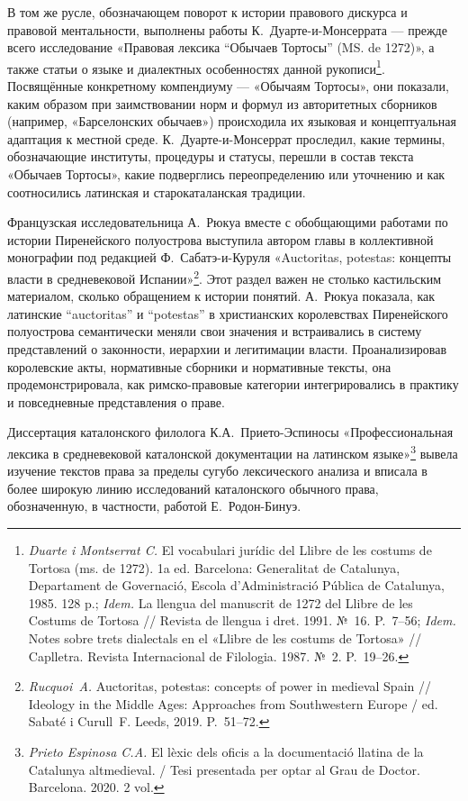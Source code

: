 В том же русле, обозначающем поворот к истории правового дискурса и правовой ментальности, выполнены работы К.~Дуарте-и-Монсеррата --- прежде всего исследование «Правовая лексика “Обычаев Тортосы” (MS. de 1272)», а также статьи о языке и диалектных особенностях данной рукописи\footnote{\emph{Duarte i Montserrat C.} El vocabulari jurídic del Llibre de les costums de Tortosa (ms. de 1272). 1a ed. Barcelona: Generalitat de Catalunya, Departament de Governació, Escola d’Administració Pública de Catalunya, 1985. 128 p.; \emph{Idem.} La llengua del manuscrit de 1272 del Llibre de les Costums de Tortosa // Revista de llengua i dret. 1991. №~16. P.~7--56; \emph{Idem.} Notes sobre trets dialectals en el «Llibre de les costums de Tortosa» // Caplletra. Revista Internacional de Filologia. 1987. №~2. P.~19--26.}. Посвящённые конкретному компендиуму --- «Обычаям Тортосы», они показали, каким образом при заимствовании норм и формул из авторитетных сборников (например, «Барселонских обычаев») происходила их языковая и концептуальная адаптация к местной среде. К.~Дуарте-и-Монсеррат проследил, какие термины, обозначающие институты, процедуры и статусы, перешли в состав текста «Обычаев Тортосы», какие подверглись переопределению или уточнению и как соотносились латинская и старокаталанская традиции.

Французская исследовательница А.~Рюкуа вместе с обобщающими работами по истории Пиренейского полуострова выступила автором главы в коллективной монографии под редакцией Ф.~Сабатэ-и-Куруля «Auctoritas, potestas: концепты власти в средневековой Испании»\footnote{\emph{Rucquoi~A. }Auctoritas, potestas: concepts of power in medieval Spain // Ideology in the Middle Ages: Approaches from Southwestern Europe / ed. Sabaté i Curull~F. Leeds, 2019. P.~51--72.}. Этот раздел важен не столько кастильским материалом, сколько обращением к истории понятий. А.~Рюкуа показала, как латинские “auctoritas” и “potestas” в христианских королевствах Пиренейского полуострова семантически меняли свои значения и встраивались в систему представлений о законности, иерархии и легитимации власти. Проанализировав королевские акты, нормативные сборники и нормативные тексты, она продемонстрировала, как римско-правовые категории интегрировались в практику и повседневные представления о праве.

Диссертация каталонского филолога К.А.~Прието-Эспиносы «Профессиональная лексика в средневековой каталонской документации на латинском языке»\footnote{\emph{Prieto Espinosa C.A.} El lèxic dels oficis a la documentació llatina de la Catalunya altmedieval. / Tesi presentada per optar al Grau de Doctor. Barcelona. 2020. 2 vol.} вывела изучение текстов права за пределы сугубо лексического анализа и вписала в более широкую линию исследований каталонского обычного права, обозначенную, в частности, работой Е.~Родон-Бинуэ.

